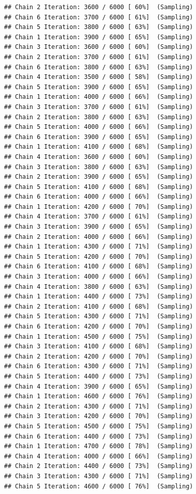 \documentclass[
]{article}
\begin{document}
\begin{verbatim}
## Chain 2 Iteration: 3600 / 6000 [ 60%]  (Sampling) 
## Chain 6 Iteration: 3700 / 6000 [ 61%]  (Sampling) 
## Chain 5 Iteration: 3800 / 6000 [ 63%]  (Sampling) 
## Chain 1 Iteration: 3900 / 6000 [ 65%]  (Sampling) 
## Chain 3 Iteration: 3600 / 6000 [ 60%]  (Sampling) 
## Chain 2 Iteration: 3700 / 6000 [ 61%]  (Sampling) 
## Chain 6 Iteration: 3800 / 6000 [ 63%]  (Sampling) 
## Chain 4 Iteration: 3500 / 6000 [ 58%]  (Sampling) 
## Chain 5 Iteration: 3900 / 6000 [ 65%]  (Sampling) 
## Chain 1 Iteration: 4000 / 6000 [ 66%]  (Sampling) 
## Chain 3 Iteration: 3700 / 6000 [ 61%]  (Sampling) 
## Chain 2 Iteration: 3800 / 6000 [ 63%]  (Sampling) 
## Chain 5 Iteration: 4000 / 6000 [ 66%]  (Sampling) 
## Chain 6 Iteration: 3900 / 6000 [ 65%]  (Sampling) 
## Chain 1 Iteration: 4100 / 6000 [ 68%]  (Sampling) 
## Chain 4 Iteration: 3600 / 6000 [ 60%]  (Sampling) 
## Chain 3 Iteration: 3800 / 6000 [ 63%]  (Sampling) 
## Chain 2 Iteration: 3900 / 6000 [ 65%]  (Sampling) 
## Chain 5 Iteration: 4100 / 6000 [ 68%]  (Sampling) 
## Chain 6 Iteration: 4000 / 6000 [ 66%]  (Sampling) 
## Chain 1 Iteration: 4200 / 6000 [ 70%]  (Sampling) 
## Chain 4 Iteration: 3700 / 6000 [ 61%]  (Sampling) 
## Chain 3 Iteration: 3900 / 6000 [ 65%]  (Sampling) 
## Chain 2 Iteration: 4000 / 6000 [ 66%]  (Sampling) 
## Chain 1 Iteration: 4300 / 6000 [ 71%]  (Sampling) 
## Chain 5 Iteration: 4200 / 6000 [ 70%]  (Sampling) 
## Chain 6 Iteration: 4100 / 6000 [ 68%]  (Sampling) 
## Chain 3 Iteration: 4000 / 6000 [ 66%]  (Sampling) 
## Chain 4 Iteration: 3800 / 6000 [ 63%]  (Sampling) 
## Chain 1 Iteration: 4400 / 6000 [ 73%]  (Sampling) 
## Chain 2 Iteration: 4100 / 6000 [ 68%]  (Sampling) 
## Chain 5 Iteration: 4300 / 6000 [ 71%]  (Sampling) 
## Chain 6 Iteration: 4200 / 6000 [ 70%]  (Sampling) 
## Chain 1 Iteration: 4500 / 6000 [ 75%]  (Sampling) 
## Chain 3 Iteration: 4100 / 6000 [ 68%]  (Sampling) 
## Chain 2 Iteration: 4200 / 6000 [ 70%]  (Sampling) 
## Chain 6 Iteration: 4300 / 6000 [ 71%]  (Sampling) 
## Chain 5 Iteration: 4400 / 6000 [ 73%]  (Sampling) 
## Chain 4 Iteration: 3900 / 6000 [ 65%]  (Sampling) 
## Chain 1 Iteration: 4600 / 6000 [ 76%]  (Sampling) 
## Chain 2 Iteration: 4300 / 6000 [ 71%]  (Sampling) 
## Chain 3 Iteration: 4200 / 6000 [ 70%]  (Sampling) 
## Chain 5 Iteration: 4500 / 6000 [ 75%]  (Sampling) 
## Chain 6 Iteration: 4400 / 6000 [ 73%]  (Sampling) 
## Chain 1 Iteration: 4700 / 6000 [ 78%]  (Sampling) 
## Chain 4 Iteration: 4000 / 6000 [ 66%]  (Sampling) 
## Chain 2 Iteration: 4400 / 6000 [ 73%]  (Sampling) 
## Chain 3 Iteration: 4300 / 6000 [ 71%]  (Sampling) 
## Chain 5 Iteration: 4600 / 6000 [ 76%]  (Sampling) 

\end{verbatim}
\end{document}
